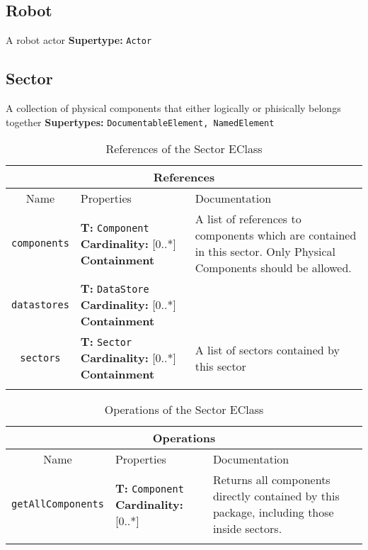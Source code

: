 \documentclass{article}
\begin{document}
\subsection[Robot]{Robot}
\label{e4smRobot}

A robot actor
\textbf{Supertype: }\texttt{Actor}
\subsection[Sector]{Sector}
\label{e4smSector}

A collection of physical components that either logically or phisically belongs together
\textbf{Supertypes: }\texttt{DocumentableElement, NamedElement}
\begin{table}[H]
\footnotesize
\begin{tabularx}{\textwidth}{|c| p{4 cm} | X |}
\hline
\multicolumn{3}{|c|}{\textbf{References}} \\
\hline
Name & Properties & Documentation \\ \hline \hline
\texttt{components}
 & 
\textbf{T:} \texttt{Component}
\newline
\textbf{Cardinality:} [0..*]
\newline
\textbf{Containment}
 & A list of references to components which are contained in this sector. Only Physical Components should be allowed.\\ \hline
\texttt{datastores}
 & 
\textbf{T:} \texttt{DataStore}
\newline
\textbf{Cardinality:} [0..*]
\newline
\textbf{Containment}
 & \\ \hline
\texttt{sectors}
 & 
\textbf{T:} \texttt{Sector}
\newline
\textbf{Cardinality:} [0..*]
\newline
\textbf{Containment}
 & A list of sectors contained by this sector\\ \hline
\caption{References of the Sector EClass}
\end{tabularx}
\label{e4smSectorref}
\end{table}
\begin{table}[H]
\footnotesize
\begin{tabularx}{\textwidth}{|c| p{4 cm} | X |}
\hline
\multicolumn{3}{|c|}{\textbf{Operations}} \\
\hline
Name & Properties & Documentation \\ \hline \hline
\texttt{getAllComponents}
 & 
\textbf{T:} \texttt{Component}
\newline
\textbf{Cardinality:} [0..*]
 & Returns all components directly contained by this package, including those inside sectors.\\ \hline
\caption{Operations of the Sector EClass}
\end{tabularx}
\label{e4smSectorop}
\end{table}
\end{document}
